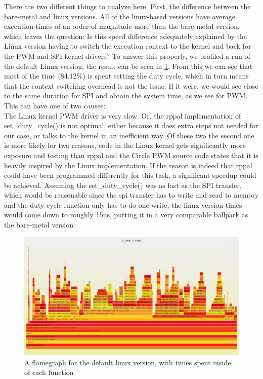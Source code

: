 There are two different things to analyze here.
First, the difference between the bare-metal and linux versions.
All of the linux-based versions have average execution times of an order of magnitude more than the bare-metal version,
which leaves the question:
Is this speed difference adequately explained by the Linux version having to switch the execution context to the kernel and back for the PWM and SPI kernel drivers?
To answer this properly, we profiled a run of the default Linux version, the result can be seen in \ref{fig:experiments:flamegraph}.
From this we can see that most of the time (84.12\%) is spent setting the duty cycle, which in turn means that the context switching overhead is not the issue.
If it were, we would see close to the same duration for SPI and obtain the system time, as we see for PWM.
This can have one of two causes:\\
The Linux kernel PWM driver is very slow.
Or, the rppal implementation of set\_duty\_cycle() is not optimal,
either because it does extra steps not needed for our case,
or talks to the kernel in an inefficient way.
Of these two the second one is more likely for two reasons,
code in the Linux kernel gets significantly more exposure and testing than rppal and the Circle PWM source code states
that it is heavily inspired by the Linux implementation.
If the reason is indeed that rppal could have been programmed differently for this task,
a significant speedup could be achieved.
Assuming the set\_duty\_cycle() was as fast as the SPI transfer,
which would be reasonable since the spi transfer has to write and read to memory and the duty cycle function only has to do one write,
the linux version times would come down to roughly 15us,
putting it in a very comparable ballpark as the bare-metal version.

\begin{figure}[H]
  \begin{center}
    \includegraphics[width=\textwidth]{assets/os-default/flamegraph.png}
    \caption{A flamegraph for the default linux version, with times spent inside of each function}
    \label{fig:experiments:flamegraph}
  \end{center}
\end{figure}

